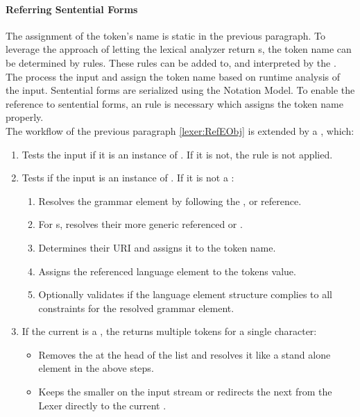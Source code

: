 \paragraph{Referring Sentential Forms}
The assignment of the token's name is  static in the previous paragraph. To leverage the approach of letting the lexical analyzer return s, the token name can be determined by rules. These rules can be added to, and interpreted by the . The  process the input  and assign the token name based on runtime analysis of the input. Sentential forms are serialized using the Notation Model. To enable the reference to sentential forms, an  rule is necessary which assigns the token name properly. \\
The workflow of the previous paragraph \ref{lexer:RefEObj} is extended by a , which:
\begin{enumerate}
	\item Tests the input  if it is an instance of . If it is not, the rule is not applied.
	\item Tests if the input is an instance of . 
	If it is not a :
	\begin{enumerate}
		\item Resolves the grammar element by following the ,  or  reference. 
		\item For s, resolves their more generic referenced  or .
		\item Determines their URI and assigns it to the token name.
		\item Assigns the referenced language element  to the tokens value.
		\item Optionally validates if the language element structure complies to all constraints for the resolved grammar element.
	\end{enumerate}
	\item If the current  is a , the  returns multiple tokens for a single character:
	\begin{itemize}
		\item Removes the  at the head of the list and resolves it like a stand alone element in the above steps.
		\item Keeps the smaller  on the input stream or redirects the next  from the Lexer directly to the current .  \\
	\end{itemize}
\end{enumerate}

